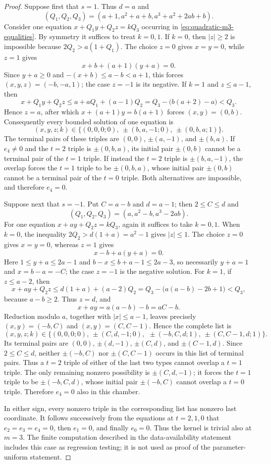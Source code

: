 \begin{proof}
Suppose first that $s=1$.  Thus $d=a$ and
\[
(Q_1,Q_2,Q_3)
=(a+1,a^2+a+b,a^3+a^2+2ab+b).
\]
Consider one equation $x+Q_1y+Q_2z=kQ_3$ occurring in
\eqref{eq:quadratic-m3-equalities}.  By symmetry it suffices to treat
$k=0,1$.  If $k=0$, then $|z|\ge2$ is impossible because
$2Q_2>a(1+Q_1)$.  The choice $z=0$ gives $x=y=0$, while $z=1$ gives
\[
x+b+(a+1)(y+a)=0.
\]
Since $y+a\ge0$ and $-(x+b)\le a-b<a+1$, this forces
$(x,y,z)=(-b,-a,1)$; the case $z=-1$ is its negative.  If $k=1$ and
$z\le a-1$, then
\[
x+Q_1y+Q_2z
\le a+aQ_1+(a-1)Q_2
=Q_3-\bigl(b(a+2)-a\bigr)<Q_3.
\]
Hence $z=a$, after which $x+(a+1)y=b(a+1)$ forces $(x,y)=(0,b)$.
Consequently every bounded solution of one equation is
\[
(x,y,z;k)\in
\{(0,0,0;0),\ \pm(b,a,-1;0),\ \pm(0,b,a;1)\}.
\]
The terminal pairs of these triples are
$(0,0)$, $\pm(a,-1)$, and $\pm(b,a)$.  If $e_4\ne0$ and the $t=2$
triple is $\pm(0,b,a)$, its initial pair $\pm(0,b)$ cannot be a terminal
pair of the $t=1$ triple.  If instead the $t=2$ triple is
$\pm(b,a,-1)$, the overlap forces the $t=1$ triple to be
$\pm(0,b,a)$, whose initial pair $\pm(0,b)$ cannot be a terminal pair of
the $t=0$ triple.  Both alternatives are impossible, and therefore
$e_4=0$.

Suppose next that $s=-1$.  Put $C=a-b$ and $d=a-1$; then
$2\le C\le d$ and
\[
(Q_1,Q_2,Q_3)=(a,a^2-b,a^3-2ab).
\]
For one equation $x+ay+Q_2z=kQ_3$, again it suffices to take $k=0,1$.
When $k=0$, the inequality $2Q_2>d(1+a)=a^2-1$ gives $|z|\le1$.
The choice $z=0$ gives $x=y=0$, whereas $z=1$ gives
\[
x-b+a(y+a)=0.
\]
Here $1\le y+a\le2a-1$ and $b-x\le b+a-1\le2a-3$, so necessarily
$y+a=1$ and $x=b-a=-C$; the case $z=-1$ is the negative solution.
For $k=1$, if $z\le a-2$, then
\[
x+ay+Q_2z
\le d(1+a)+(a-2)Q_2
=Q_3-\bigl(a(a-b)-2b+1\bigr)<Q_3,
\]
because $a-b\ge2$.  Thus $z=d$, and
\[
x+ay=a(a-b)-b=aC-b.
\]
Reduction modulo $a$, together with $|x|\le a-1$, leaves precisely
$(x,y)=(-b,C)$ and $(x,y)=(C,C-1)$.  Hence the complete list is
\[
(x,y,z;k)\in
\{(0,0,0;0),\ \pm(C,d,-1;0),\
  \ \pm(-b,C,d;1),\ \pm(C,C-1,d;1)\}.
\]
Its terminal pairs are $(0,0)$, $\pm(d,-1)$, $\pm(C,d)$, and
$\pm(C-1,d)$.  Since $2\le C\le d$, neither $\pm(-b,C)$ nor
$\pm(C,C-1)$ occurs in this list of terminal pairs.  Thus a $t=2$ triple
of either of the last two types cannot overlap a $t=1$ triple.  The only
remaining nonzero possibility is $\pm(C,d,-1)$; it forces the $t=1$
triple to be $\pm(-b,C,d)$, whose initial pair $\pm(-b,C)$ cannot overlap
a $t=0$ triple.  Therefore $e_4=0$ also in this chamber.

In either sign, every nonzero triple in the corresponding list has nonzero
last coordinate.  It follows successively from the equations at
$t=2,1,0$ that $e_2=e_3=e_4=0$, then $e_1=0$, and finally $e_0=0$.
Thus the kernel is trivial also at $m=3$.  The finite computation described in
the data-availability statement includes this case as regression testing; it
is not used as proof of the parameter-uniform statement.
\end{proof}

